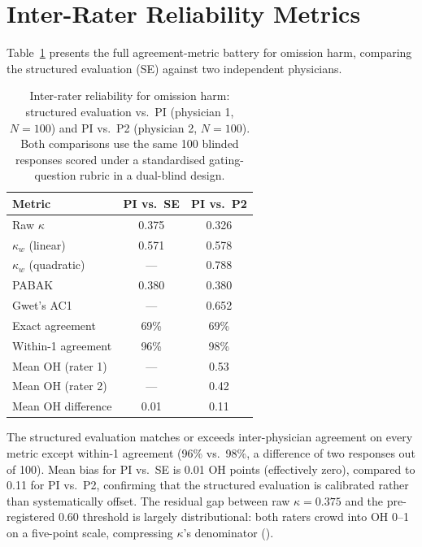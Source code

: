 \documentclass{article}
\begin{document}
\section{Inter-Rater Reliability Metrics}
\label{app:irr}

Table~\ref{tab:irr_full} presents the full agreement-metric battery for omission harm, comparing the structured evaluation (SE) against two independent physicians.

\begin{table}[h]
\centering
\caption{Inter-rater reliability for omission harm: structured evaluation vs.\ PI (physician 1, $N = 100$) and PI vs.\ P2 (physician 2, $N = 100$). Both comparisons use the same 100 blinded responses scored under a standardised gating-question rubric in a dual-blind design.}
\label{tab:irr_full}
\small
\begin{tabular}{lcc}
\toprule
Metric & PI vs.\ SE & PI vs.\ P2 \\
\midrule
Raw $\kappa$ & 0.375 & 0.326 \\
$\kappa_w$ (linear) & 0.571 & 0.578 \\
$\kappa_w$ (quadratic) & --- & 0.788 \\
PABAK & 0.380 & 0.380 \\
Gwet's AC1 & --- & 0.652 \\
Exact agreement & 69\% & 69\% \\
Within-1 agreement & 96\% & 98\% \\
Mean OH (rater 1) & --- & 0.53 \\
Mean OH (rater 2) & --- & 0.42 \\
Mean OH difference & 0.01 & 0.11 \\
\bottomrule
\end{tabular}
\end{table}

\noindent The structured evaluation matches or exceeds inter-physician agreement on every metric except within-1 agreement (96\% vs.\ 98\%, a difference of two responses out of 100).
Mean bias for PI vs.\ SE is 0.01 OH points (effectively zero), compared to 0.11 for PI vs.\ P2, confirming that the structured evaluation is calibrated rather than systematically offset.
The residual gap between raw $\kappa = 0.375$ and the pre-registered 0.60 threshold is largely distributional: both raters crowd into OH 0--1 on a five-point scale, compressing $\kappa$'s denominator (\citealt{feinstein1990kappa}).
\end{document}
